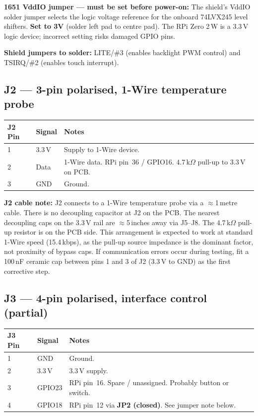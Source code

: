 \documentclass[11pt,a4paper]{article}
\begin{document}
\begin{warnbox}
\textbf{1651 VddIO jumper --- must be set before power-on:}
The shield's VddIO solder jumper selects the logic voltage reference for
the onboard 74LVX245 level shifters.
\textbf{Set to 3V} (solder left pad to centre pad).
The RPi Zero 2\,W is a 3.3\,V logic device; incorrect setting risks damaged GPIO pins.

\smallskip
\textbf{Shield jumpers to solder:}
LITE/\#3 (enables backlight PWM control) and TSIRQ/\#2 (enables touch interrupt).
\end{warnbox}

\subsection{J2 --- 3-pin polarised, 1-Wire temperature probe}

\begin{tabular}{C{1.4cm} C{2.2cm} L{9cm}}
  \toprule
  \color{white}\textbf{J2 Pin} &
  \color{white}\textbf{Signal} &
  \color{white}\textbf{Notes} \\
   & 3.3\,V  & Supply to 1-Wire device. \\
  2 & Data    & 1-Wire data. RPi pin~36 / GPIO16. 4.7\,k$\Omega$ pull-up to 3.3\,V on PCB. \\
  3 & GND     & Ground. \\
  \bottomrule
\end{tabular}

\begin{notebox}
\textbf{J2 cable note:} J2 connects to a 1-Wire temperature probe via a
$\approx$1\,metre cable. There is no decoupling capacitor at J2 on the PCB.
The nearest decoupling caps on the 3.3\,V rail are $\approx$5\,inches away
via J5--J8. The 4.7\,k$\Omega$ pull-up resistor is on the PCB side.
This arrangement is expected to work at standard 1-Wire speed (15.4\,kbps),
as the pull-up source impedance is the dominant factor, not proximity of bypass caps.
If communication errors occur during testing, fit a 100\,nF ceramic cap
between pins 1 and 3 of J2 (3.3\,V to GND) as the first corrective step.
\end{notebox}

\subsection{J3 --- 4-pin polarised, interface control (partial)}

\begin{tabular}{C{1.4cm} C{2.2cm} L{9cm}}
  \toprule
  \color{white}\textbf{J3 Pin} &
  \color{white}\textbf{Signal} &
  \color{white}\textbf{Notes} \\
   & GND     & Ground. \\
  2 & 3.3\,V  & 3.3\,V supply. \\
  3 & GPIO23  & RPi pin~16. Spare / unassigned. Probably button or switch. \\
  4 & GPIO18  & RPi pin~12 via \textbf{JP2 (closed)}. See jumper note below. \\
  \bottomrule
\end{tabular}
\end{document}
